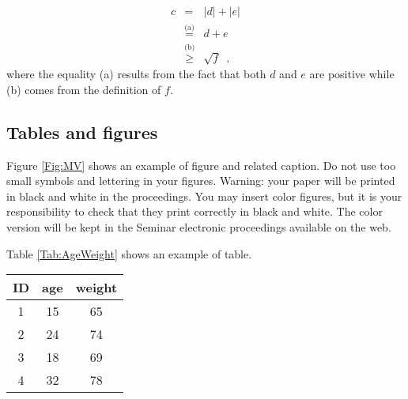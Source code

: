 \documentclass{SeminarV2}
\begin{document}
\begin{eqnarray}
c&=&|d|+|e|\nonumber\\
&\stackrel{\text{(a)}}{=}&d+e\nonumber\\
&\stackrel{\text{(b)}}{\geq}&\sqrt{f}\enspace,
\end{eqnarray}
\noindent where the equality (a) results from the fact that both
$d$ and $e$ are positive while (b) comes from the definition of
$f$.

\subsection{Tables and figures}

Figure \ref{Fig:MV} shows an example of figure and related
caption.  Do not use too small symbols and lettering in your
figures.  Warning: your paper will be printed in black and white
in the proceedings.  You may insert color figures, but it is your
responsibility to check that they print correctly in black and
white.  The color version will be kept in the Seminar electronic
proceedings available on the web.

\begin{figure}[ht]
\centering
\end{figure}

Table \ref{Tab:AgeWeight} shows an example of table.

\begin{table}[h!]
  \centering
  \begin{tabular}{|c|c|c|}
    \hline
    ID & age & weight \\
    \hline
    1& 15 & 65 \\
    2& 24 & 74\\
    3& 18 & 69 \\
    4& 32 & 78 \\
    \hline
  \end{tabular}
\end{table}


\begin{footnotesize}


\end{footnotesize}

\end{document}
